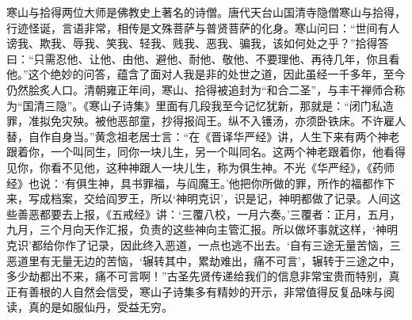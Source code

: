 \begin{book}[《寒山子诗集》]
    寒山与拾得两位大师是佛教史上著名的诗僧。唐代天台山国清寺隐僧寒山与拾得，行迹怪诞，言语非常，相传是文殊菩萨与普贤菩萨的化身。寒山问曰：“世间有人谤我、欺我、辱我、笑我、轻我、贱我、恶我、骗我，该如何处之乎？”拾得答曰：“只需忍他、让他、由他、避他、耐他、敬他、不要理他、再待几年，你且看他。”这个绝妙的问答，蕴含了面对人我是非的处世之道，因此虽经一千多年，至今仍然脍炙人口。清朝雍正年间，寒山、拾得被追封为“和合二圣”，与丰干禅师合称为“国清三隐”。《寒山子诗集》里面有几段我至今记忆犹新，那就是：“闭门私造罪，准拟免灾殃。被他恶部童，抄得报阎王。纵不入镬汤，亦须卧铁床。不许雇人替，自作自身当。”黄念祖老居士言：“在《晋译华严经》讲，人生下来有两个神老跟着你，一个叫同生，同你一块儿生，另一个叫同名。这两个神老跟着你，他看得见你，你看不见他，这种神跟人一块儿生，称为俱生神。不光《华严经》，《药师经》也说：‘有俱生神，具书罪福，与阎魔王。’他把你所做的罪，所作的福都作下来，写成档案，交给阎罗王，所以‘神明克识’，识是记，神明都做了记录。人间这些善恶都要去上报，《五戒经》讲：‘三覆八校，一月六奏。’三覆者：正月，五月，九月，三个月向天作汇报，负责的这些神向主管汇报。所以做坏事就这样，‘神明克识’都给你作了记录，因此终入恶道，一点也逃不出去。‘自有三途无量苦恼，三恶道里有无量无边的苦恼，‘辗转其中，累劫难出，痛不可言’，辗转于三途之中，多少劫都出不来，痛不可言啊！”古圣先贤传递给我们的信息非常宝贵而特别，真正有善根的人自然会信受，寒山子诗集多有精妙的开示，非常值得反复品味与阅读，真的是如服仙丹，受益无穷。
\end{book}
